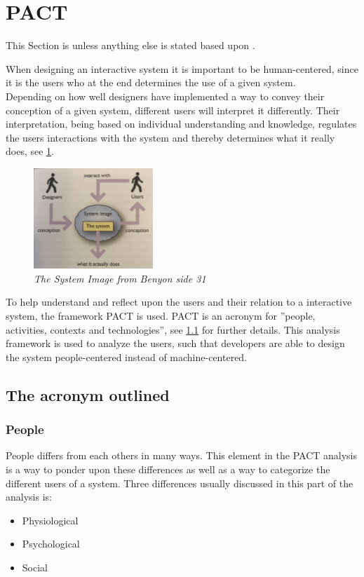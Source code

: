 \section{PACT}\label{sec:PACT}
This Section is unless anything else is stated based upon \cite{Benyon}.

When designing an interactive system it is important to be human-centered, since it is the users who at the end determines the use of a given system.
\\\indent
Depending on how well designers have implemented a way to convey their conception of a given system, different users will interpret it differently.
Their interpretation, being based on individual understanding and knowledge, regulates the users interactions with the system and thereby determines what it really does, see \cref{fig:PACT-SystemImage}.

\begin{figure}[H]
	\centering
	\includegraphics[width=0.4\textwidth]{billeder/SystemImage-Benyon.png}
	\caption{\textit{The System Image from {\color{red}Benyon side 31}}}
	\label{fig:PACT-SystemImage}
\end{figure}

To help understand and reflect upon the users and their relation to a interactive system, the framework PACT is used.
PACT is an acronym for ''people, activities, contexts and technologies'', see \cref{sec:PACT-method} for further details.
This analysis framework is used to analyze the users, such that developers are able to design the system people-centered instead of machine-centered.

\subsection{The acronym outlined}\label{sec:PACT-method}
\subsubsection{People}
People differs from each others in many ways.
This element in the PACT analysis is a way to ponder upon these differences as well as a way to categorize the different users of a system.
Three differences usually discussed in this part of the analysis is:
\begin{itemize}
	\item Physiological
	\item Psychological
	\item Social
\end{itemize}

